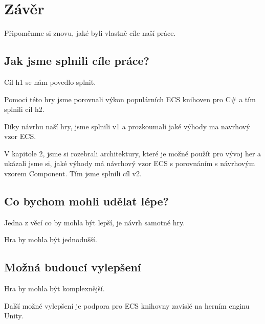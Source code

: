 \chapter{Závěr}
Připoměnme si znovu, jaké byli vlastně cíle naší práce.

\section{Jak jsme splnili cíle práce?}
Cíl h1 se nám povedlo splnit.

Pomocí této hry jsme porovnali výkon populárních ECS knihoven pro C\# a tím splnili cíl h2.

Díky návrhu naší hry, jsme splnili v1 a prozkoumali jaké výhody ma navrhový vzor ECS.

V kapitole 2, jsme si rozebrali architektury, které je možné použít pro vývoj her a ukázali jsme si, jaké výhody má návrhový vzor ECS s porovnáním s návrhovým vzorem Component. Tím jsme splnili cíl v2.

\section{Co bychom mohli udělat lépe?}
Jedna z věcí co by mohla být lepší, je návrh samotné hry.

Hra by mohla být jednodušší.

\section{Možná budoucí vylepšení}
Hra by mohla být komplexnější.

Další možné vylepšení je podpora pro ECS knihovny zavislé na herním enginu Unity.


